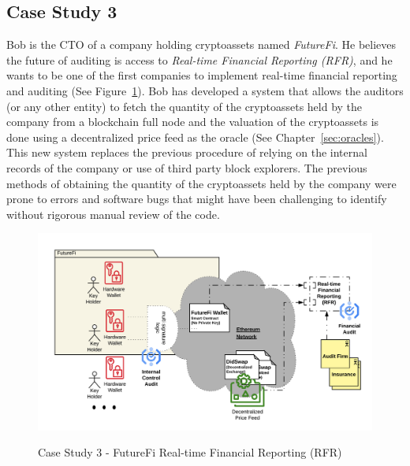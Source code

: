 \subsection{Case Study 3} \label{sec:auditing:case-studies:valuation} %
Bob is the CTO of a company holding cryptoassets named \textit{FutureFi}. He believes the future of auditing is access to \textit{Real-time Financial Reporting (RFR)}, and he wants to be one of the first companies to implement real-time financial reporting and auditing (See Figure~\ref{fig:RFR}). Bob has developed a system that allows the auditors (or any other entity) to fetch the quantity of the cryptoassets held by the company from a blockchain full node and the valuation of the cryptoassets is done using a decentralized price feed as the oracle (See Chapter~\ref{sec:oracles}). This new system replaces the previous procedure of relying on the internal records of the company or use of third party block explorers. The previous methods of obtaining the quantity of the cryptoassets held by the company were prone to errors and software bugs that might have been challenging to identify without rigorous manual review of the code. 


\begin{figure}[t]
    \centering
{\includegraphics[width=1\textwidth]{figures/BlockchainAudit-FutureFi.png}}
{\caption[Case Study 3 - FutureFi Real-time Financial Reporting (RFR)]{Case Study 3 - FutureFi Real-time Financial Reporting (RFR)}\label{fig:RFR}}
\end{figure}


